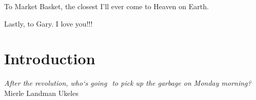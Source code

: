 \documentclass[nofonts,nols,justified,nobib]{tufte-book}
\begin{document}
To Market Basket, the closest I'll ever come to Heaven on Earth.

Lastly, to Gary. I love you!!!


\tableofcontents


\newpage
\setcounter{page}{1}
\renewcommand{\thepage}{\arabic{page}}

\chapter*{Introduction}

\begin{flushright}
\begin{flushright}
\emph{After the revolution, who`s going  to pick up the garbage on Monday morning?} \cite{ukeles_manifesto_1969}\\
Mierle Landman Ukeles
\end{flushright}
\end{flushright}
\end{document}
